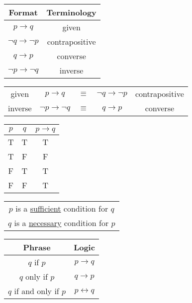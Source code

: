 \documentclass{article}
\begin{document}
\begin{center}
  \begin{tabular}{c|c}
    Format                          & Terminology    \\
    \hline
    \(p \rightarrow q\)             & given          \\
    \(\lnot q \rightarrow \lnot p\) & contrapositive \\
    \(q \rightarrow p\)             & converse       \\
    \(\lnot p \rightarrow \lnot q\) & inverse        \\
  \end{tabular}
  \qquad
  \begin{tabular}{ccccc}
    given   & \(p \rightarrow q\)             & \(\equiv\) & \(\lnot q \rightarrow \lnot p\) & contrapositive \\
    inverse & \(\lnot p \rightarrow \lnot q\) & \(\equiv\) & \(q \rightarrow p\)             & converse
  \end{tabular}
\end{center}

\begin{center}
  \begin{tabular}{c|c|c}
    \(p\) & \(q\) & \(p \rightarrow q\) \\
    \hline
    T     & T     & T                   \\
    T     & F     & F                   \\
    F     & T     & T                   \\
    F     & F     & T                   \\
  \end{tabular}
  \quad
  \begin{tabular}{c}
    \(p\) is a \underline{sufficient} condition for \(q\) \\
    \(q\) is a \underline{necessary} condition for \(p\)
  \end{tabular}
  \quad
  \begin{tabular}{c|c}
    Phrase                     & Logic                   \\
    \hline
    \(q\) if \(p\)             & \(p \rightarrow q\)     \\
    \(q\) only if \(p\)        & \(q \rightarrow p\)     \\
    \(q\) if and only if \(p\) & \(p \leftrightarrow q\)
  \end{tabular}
\end{center}
\end{document}
